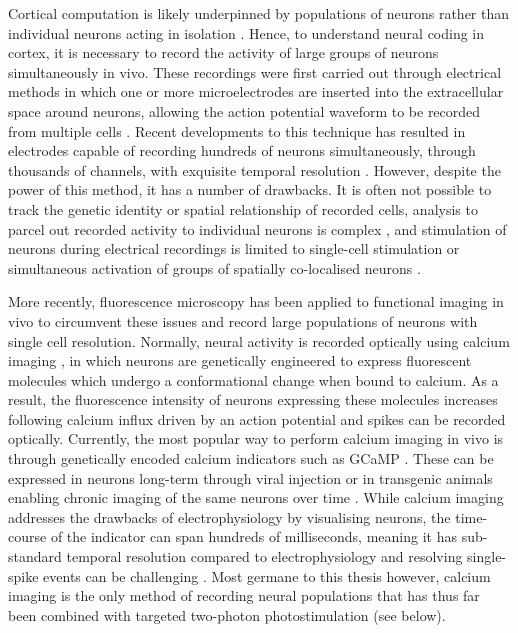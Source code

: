 Cortical computation is likely underpinned by populations of neurons  rather than individual neurons acting in isolation \cite{averbeck_neural_2006, kohn_correlations_2016, panzeri_cracking_2017}. Hence, to understand neural coding in cortex, it is necessary to record the activity of large groups of neurons simultaneously in vivo. These recordings were first carried out through electrical methods in which one or more microelectrodes are inserted into the extracellular space around neurons, allowing the action potential waveform to be recorded from multiple cells \cite{hubel_tungsten_1957, mcnaughton_stereotrode_1983, buzsaki_large-scale_2004}. Recent developments to this technique has resulted in electrodes capable of recording hundreds of neurons simultaneously, through thousands of channels, with exquisite temporal resolution \cite{steinmetz_neuropixels_2021}. However, despite the power of this method, it has a number of drawbacks. It is often not possible to track the genetic identity or spatial relationship of recorded cells, analysis to parcel out recorded activity to individual neurons is complex \cite{harris_improving_2016}, and stimulation of neurons during electrical recordings is limited to single-cell stimulation \cite{margrie_vivo_2002, houweling_nanostimulation_2010} or simultaneous activation of groups of spatially co-localised neurons \cite{penfield_w_somatic_1937, asanuma_functional_1967, salzman_cortical_1990, romo_somatosensory_1998, cardin_driving_2009, kim_integration_2017}.

More recently, fluorescence microscopy has been applied to functional imaging in vivo to circumvent these issues and record large populations of neurons with single cell resolution. Normally, neural activity is recorded optically using calcium imaging \cite{grienberger_imaging_2012}, in which neurons are genetically engineered to express fluorescent molecules which undergo a conformational change when bound to calcium. As a result, the fluorescence intensity of neurons expressing these molecules increases following calcium influx driven by an action potential \cite{berridge_neuronal_1998} and spikes can be recorded optically. Currently, the most popular way to perform calcium imaging in vivo is through genetically encoded calcium indicators \cite{looger_genetically_2012} such as GCaMP \cite{chen_ultrasensitive_2013, dana_high-performance_2019}. These can be expressed in neurons long-term through viral injection \cite{packer_simultaneous_2015} or in transgenic animals \cite{huang_relationship_2021} enabling chronic imaging of the same neurons over time \cite{andermann_chronic_2013}. While calcium imaging addresses the drawbacks of electrophysiology by visualising neurons, the time-course of the indicator can span hundreds of milliseconds, meaning it has sub-standard temporal resolution compared to electrophysiology and resolving single-spike events can be challenging \cite{huang_relationship_2021}. Most germane to this thesis however, calcium imaging is the only method of recording neural populations that has thus far been combined with targeted two-photon photostimulation \cite{packer_simultaneous_2015} (see below).

